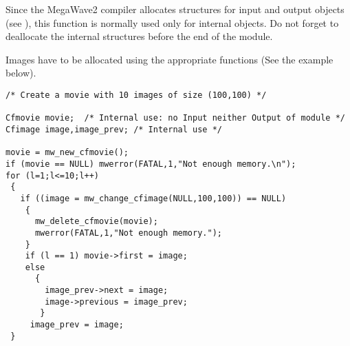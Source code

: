 Since the MegaWave2 compiler allocates structures for input and output 
objects (see \volI), this function is normally used only for internal objects.
Do not forget to deallocate the internal structures before the end
of the module.

Images have to be allocated using the appropriate functions (See the example
below).

\Next
\Example
\begin{verbatim}
/* Create a movie with 10 images of size (100,100) */

Cfmovie movie;  /* Internal use: no Input neither Output of module */
Cfimage image,image_prev; /* Internal use */

movie = mw_new_cfmovie();
if (movie == NULL) mwerror(FATAL,1,"Not enough memory.\n");
for (l=1;l<=10;l++)
 {
   if ((image = mw_change_cfimage(NULL,100,100)) == NULL)
    {
      mw_delete_cfmovie(movie);
      mwerror(FATAL,1,"Not enough memory.");
    }
    if (l == 1) movie->first = image;
    else
      {
        image_prev->next = image;
        image->previous = image_prev;
       }
     image_prev = image;
 }
\end{verbatim}
\newpage %

